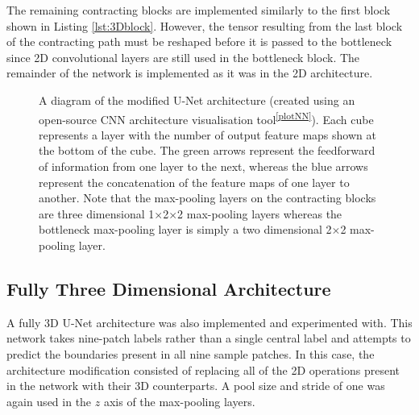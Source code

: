 The remaining contracting blocks are implemented similarly to the first block shown in Listing \ref{lst:3Dblock}. However, the tensor resulting from the last block of the contracting path must be reshaped before it is passed to the bottleneck since 2D convolutional layers are still used in the bottleneck block. The remainder of the network is implemented as it was in the 2D architecture.

\begin{figure}[!t]
    \centering
    \hspace*{-0.3cm}
    
    \caption[A diagram of the modified U-Net architecture (created using an open-source CNN architecture visualisation tool). Each cube represents a layer with the number of output feature maps shown at the bottom of the cube. The green arrows represent the feedforward of information from one layer to the next, whereas the blue arrows represent the concatenation of the feature maps of one layer to another.]{A diagram of the modified U-Net architecture (created using an open-source CNN architecture visualisation tool\textsuperscript{\ref{plotNN}}). Each cube represents a layer with the number of output feature maps shown at the bottom of the cube. The green arrows represent the feedforward of information from one layer to the next, whereas the blue arrows represent the concatenation of the feature maps of one layer to another. Note that the max-pooling layers on the contracting blocks are three dimensional 1$\times$2$\times$2 max-pooling layers whereas the bottleneck max-pooling layer is simply a two dimensional 2$\times$2 max-pooling layer.}
    \label{fig:unetushape3D}
\end{figure}



\subsection{Fully Three Dimensional Architecture}

A fully 3D U-Net architecture was also implemented and experimented with. This network takes nine-patch labels rather than a single central label and attempts to predict the boundaries present in all nine sample patches. In this case, the architecture modification consisted of replacing all of the 2D operations present in the network with their 3D counterparts. A pool size and stride of one was again used in the $z$ axis of the max-pooling layers.

